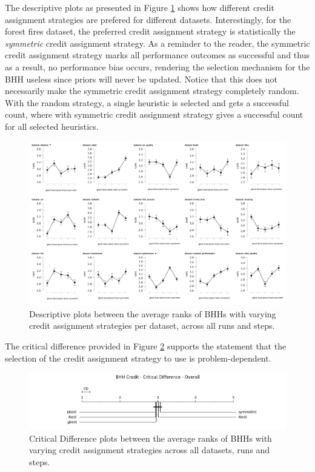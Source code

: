 The descriptive plots as presented in Figure \ref{fig:results:credit:descriptive:descriptive} shows how different credit assignment strategies are prefered for different datasets. Interestingly, for the forest fires dataset, the preferred credit assignment strategy is statistically the \textit{symmetric} credit assignment strategy. As a reminder to the reader, the symmetric credit assignment strategy marks all performance outcomes as successful and thus as a result, no performance bias occurs, rendering the selection mechanism for the \Ac{BHH} useless since priors will never be updated. Notice that this does not necessarily make the symmetric credit assignment strategy completely random. With the random strategy, a single heuristic is selected and gets a successful count, where with symmetric credit assignment strategy gives a successful count for all selected heuristics.

\begin{figure}[htbp]
	\centering
	\includegraphics[width=\textwidth]{analysis/bhh_credit/figures/descriptive/descriptive.png}
	\caption{Descriptive plots between the average ranks of \Acsp{BHH} with varying credit assignment strategies per dataset, across all runs and steps.}
	\label{fig:results:credit:descriptive:descriptive}
\end{figure}

The critical difference provided in Figure \ref{fig:results:credit:descriptive:cd} supports the statement that the selection of the credit assignment strategy to use is problem-dependent.

\begin{figure}[htbp]
	\centering
	\includegraphics[width=\textwidth]{analysis/bhh_credit/figures/cd/overall.png}
	\caption{Critical Difference plots between the average ranks of \Acsp{BHH} with varying credit assignment strategies across all datasets, runs and steps.}
	\label{fig:results:credit:descriptive:cd}
\end{figure}


